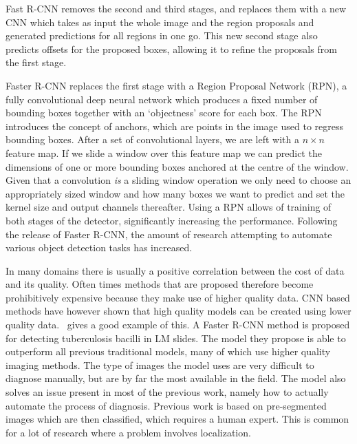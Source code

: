 Fast R-CNN removes the second and third stages, and replaces them with a new CNN which takes as input the whole image and the region proposals and generated predictions for all regions in one go.
This new second stage also predicts offsets for the proposed boxes, allowing it to refine the proposals from the first stage.

Faster R-CNN replaces the first stage with a Region Proposal Network (RPN), a fully convolutional deep neural network which produces a fixed number of bounding boxes together with an `objectness' score for each box.
The RPN introduces the concept of anchors, which are points in the image used to regress bounding boxes.
After a set of convolutional layers, we are left with a \(n\times n\) feature map.
If we slide a window over this feature map we can predict the dimensions of one or more bounding boxes anchored at the centre of the window.
Given that a convolution \textit{is} a sliding window operation we only need to choose an appropriately sized window and how many boxes we want to predict and set the kernel size and output channels thereafter.
Using a RPN allows of training of both stages of the detector, significantly increasing the performance.
Following the release of Faster R-CNN, the amount of research attempting to automate various object detection tasks has increased. 

In many domains there is usually a positive correlation between the cost of data and its quality.
Often times methods that are proposed therefore become prohibitively expensive because they make use of higher quality data.
CNN based methods have however shown that high quality models can be created using lower quality data.~\cite{el_melegy_automatic_2019} gives a good example of this.
A Faster R-CNN method is proposed for detecting tuberculosis bacilli in LM slides.
The model they propose is able to outperform all previous traditional models, many of which use higher quality imaging methods.
The type of images the model uses are very difficult to diagnose manually, but are by far the most available in the field.
The model also solves an issue present in most of the previous work, namely how to actually automate the process of diagnosis.
Previous work is based on pre-segmented images which are then classified, which requires a human expert.
This is common for a lot of research where a problem involves localization. 

